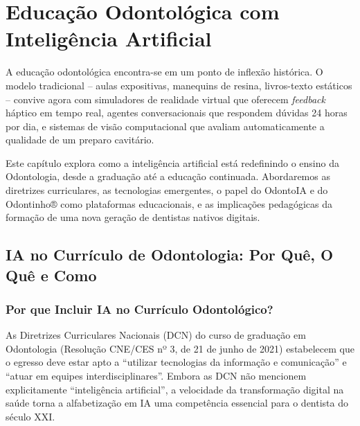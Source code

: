 \chapter{Educação Odontológica com Inteligência Artificial}
\label{cap:educacao-odontologica-ia}

\nivelquatro

A educação odontológica encontra-se em um ponto de inflexão histórica. O modelo
tradicional -- aulas expositivas, manequins de resina, livros-texto estáticos --
convive agora com simuladores de realidade virtual que oferecem \textit{feedback}
háptico em tempo real, agentes conversacionais que respondem dúvidas 24 horas
por dia, e sistemas de visão computacional que avaliam automaticamente a
qualidade de um preparo cavitário.

Este capítulo explora como a inteligência artificial está redefinindo o ensino
da Odontologia, desde a graduação até a educação continuada. Abordaremos as
diretrizes curriculares, as tecnologias emergentes, o papel do OdontoIA e do
Odontinho® como plataformas educacionais, e as implicações pedagógicas da
formação de uma nova geração de dentistas nativos digitais.

 
 

\section{IA no Currículo de Odontologia: Por Quê, O Quê e Como}
\label{sec:curriculo-ia}

\nivelquatro

\subsection{Por que Incluir IA no Currículo Odontológico?}

As Diretrizes Curriculares Nacionais (DCN) do curso de graduação em Odontologia
(Resolução CNE/CES nº 3, de 21 de junho de 2021) estabelecem que o egresso deve
estar apto a ``utilizar tecnologias da informação e comunicação'' e ``atuar em
equipes interdisciplinares''. Embora as DCN não mencionem explicitamente
``inteligência artificial'', a velocidade da transformação digital na saúde
torna a alfabetização em IA uma competência essencial para o dentista do
século XXI.

